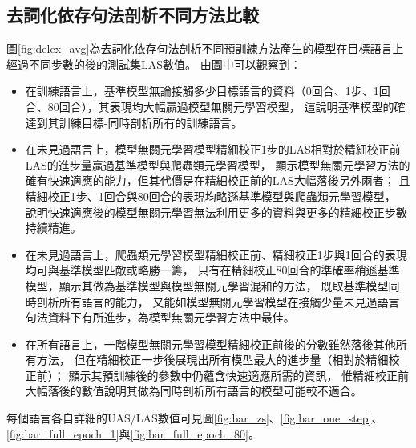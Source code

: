 \subsection{去詞化依存句法剖析不同方法比較}

圖\ref{fig:delex_avg}為去詞化依存句法剖析不同預訓練方法產生的模型在目標語言上經過不同步數的\finetune 後的測試集LAS數值。
由圖中可以觀察到：
\begin{itemize}
    \item 在訓練語言上，基準模型無論接觸多少目標語言的資料（0回合、1步、1回合、80回合），其表現均大幅贏過模型無關元學習模型，
這說明基準模型的確達到其訓練目標-同時剖析所有的訓練語言。
    \item 在未見過語言上，模型無關元學習模型精細校正1步的LAS相對於精細校正前LAS的進步量贏過基準模型與爬蟲類元學習模型，
顯示模型無關元學習方法的確有快速適應的能力，但其代價是在精細校正前的LAS大幅落後另外兩者；
且精細校正1步、1回合與80回合的表現均略遜基準模型與爬蟲類元學習模型，
說明快速適應後的模型無關元學習無法利用更多的資料與更多的精細校正步數持續精進。
    \item 在未見過語言上，爬蟲類元學習模型精細校正前、精細校正1步與1回合的表現均可與基準模型匹敵或略勝一籌，
    只有在精細校正80回合的準確率稍遜基準模型，顯示其做為基準模型與模型無關元學習混和的方法，
既取基準模型同時剖析所有語言的能力，
又能如模型無關元學習模型在接觸少量未見過語言句法資料下有所進步，為模型無關元學習方法中最佳。
    \item 在所有語言上，一階模型無關元學習模型精細校正前後的分數雖然落後其他所有方法，
但在精細校正一步後展現出所有模型最大的進步量（相對於精細校正前）；
顯示其預訓練後的參數中仍蘊含快速適應所需的資訊，
惟精細校正前大幅落後的數值說明其做為同時剖析所有語言的模型可能較不適合。
\end{itemize}
每個語言各自詳細的UAS/LAS數值可見圖\ref{fig:bar_zs}、\ref{fig:bar_one_step}、
\ref{fig:bar_full_epoch_1}與\ref{fig:bar_full_epoch_80}。
